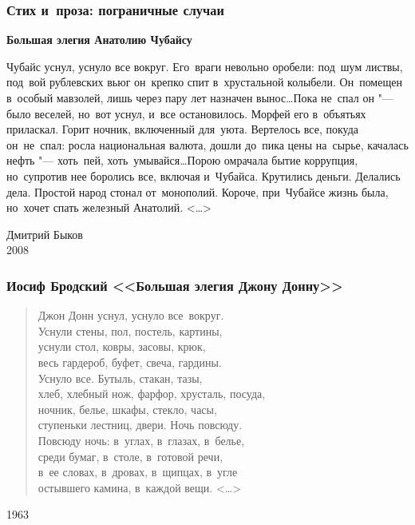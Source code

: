 \documentclass{beamer}
\begin{document}

\begin{frame}
\frametitle{Стих и~проза: пограничные случаи}

\begin{center}
\textbf{Большая элегия Анатолию Чубайсу}
\end{center}

\begin{flushleft}
Чубайс уснул, уснуло все вокруг. Его~враги невольно оробели: под~шум листвы, под~вой рублевских вьюг он~крепко спит в~хрустальной колыбели. Он~помещен в~особый мавзолей, лишь через пару лет назначен вынос\ldots Пока не~спал он "--- было веселей, но~вот уснул, и~все остановилось. Морфей его в~объятьях приласкал. Горит ночник, включенный для~уюта. Вертелось все, покуда он~не~спал: росла национальная валюта, дошли до~пика цены на~сырье, качалась нефть "--- хоть~пей, хоть~умывайся\ldots Порою омрачала бытие коррупция, но~супротив нее боролись все, включая и~Чубайса. Крутились деньги. Делались дела. Простой народ стонал от~монополий. Короче, при~Чубайсе жизнь была, но~хочет спать железный Анатолий. <\ldots>
\end{flushleft}

Дмитрий Быков\\
2008
\end{frame}


\begin{frame}
\frametitle{Иосиф Бродский <<Большая элегия Джону Донну>>}

\begin{verse}
Джон Донн уснул, уснуло все~вокруг.\\
Уснули стены, пол, постель, картины,\\
уснули стол, ковры, засовы, крюк,\\
весь гардероб, буфет, свеча, гардины.\\
Уснуло все. Бутыль, стакан, тазы,\\
хлеб, хлебный нож, фарфор, хрусталь, посуда,\\
ночник, белье, шкафы, стекло, часы,\\
ступеньки лестниц, двери. Ночь повсюду.\\
Повсюду ночь: в~углах, в~глазах, в~белье,\\
среди бумаг, в~столе, в~готовой речи,\\
в~ее словах, в~дровах, в~щипцах, в~угле\\
остывшего камина, в~каждой вещи. <\ldots> 
\end{verse}

1963

\end{frame}
\end{document}
